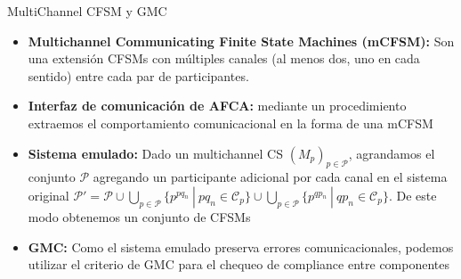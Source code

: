 \documentclass[10pt,xcolor={table,dvipsnames},t]{beamer}
\begin{document}
\begin{frame}{MultiChannel CFSM y GMC}
 \vspace{\fill}
\begin{itemize}
    \item \textbf{Multichannel Communicating Finite State Machines (mCFSM):} Son una extensión CFSMs con múltiples canales (al menos dos, uno en cada sentido) entre cada par de participantes.
    
    \item \textbf{Interfaz de comunicación de AFCA:} mediante un procedimiento extraemos el comportamiento comunicacional en la forma de una mCFSM
    
    \item \textbf{Sistema emulado:} Dado un multichannel CS $(M_p)_{p \in \mathcal{P}}$, agrandamos el conjunto $ \mathcal{P}$ agregando un participante adicional por cada canal en el sistema original $\mathcal{P}'=\mathcal{P} \cup \bigcup_{p \in \mathcal{P}} \{p^{pq_n} \ | \ pq_n \in \mathcal{C}_p \} \cup \bigcup_{p \in \mathcal{P}} \{p^{qp_n} \ | \ qp_n \in \mathcal{C}_p \}$. De este modo obtenemos un conjunto de CFSMs
    
    \item \textbf{GMC:} Como el sistema emulado preserva errores comunicacionales, podemos utilizar el criterio de GMC para el chequeo de compliance entre componentes
\end{itemize}
 \vspace{\fill}
\end{frame}
\end{document}
